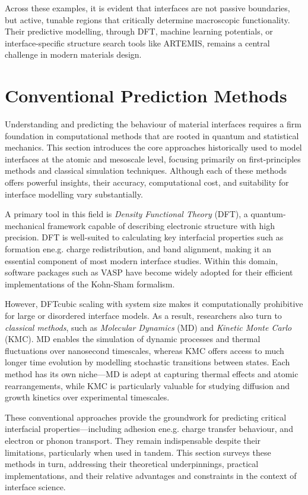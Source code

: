 Across these examples, it is evident that interfaces are not passive boundaries, but active, tunable regions that critically determine macroscopic functionality. Their predictive modelling, through DFT, machine learning potentials, or interface-specific structure search tools like ARTEMIS, remains a central challenge in modern materials design. 
 
\section{Conventional Prediction Methods} \label{section:conventional_methods} 
 
Understanding and predicting the behaviour of material interfaces requires a firm foundation in computational methods that are rooted in quantum and statistical mechanics. This section introduces the core approaches historically used to model interfaces at the atomic and mesoscale level, focusing primarily on first-principles methods and classical simulation techniques. Although each of these methods offers powerful insights, their accuracy, computational cost, and suitability for interface modelling vary substantially. 
 
A primary tool in this field is \textit{Density Functional Theory} (DFT), a quantum-mechanical framework capable of describing electronic structure with high precision. DFT is well-suited to calculating key interfacial properties such as formation ene.g. charge redistribution, and band alignment, making it an essential component of most modern interface studies. Within this domain, software packages such as \textsc{VASP} have become widely adopted for their efficient implementations of the Kohn-Sham formalism. 
 
However, DFT\rqss cubic scaling with system size makes it computationally prohibitive for large or disordered interface models. As a result, researchers also turn to \textit{classical methods}, such as \textit{Molecular Dynamics} (MD) and \textit{Kinetic Monte Carlo} (KMC). MD enables the simulation of dynamic processes and thermal fluctuations over nanosecond timescales, whereas KMC offers access to much longer time evolution by modelling stochastic transitions between states. Each method has its own niche---MD is adept at capturing thermal effects and atomic rearrangements, while KMC is particularly valuable for studying diffusion and growth kinetics over experimental timescales. 
 
These conventional approaches provide the groundwork for predicting critical interfacial properties---including adhesion ene.g. charge transfer behaviour, and electron or phonon transport. They remain indispensable despite their limitations, particularly when used in tandem. This section surveys these methods in turn, addressing their theoretical underpinnings, practical implementations, and their relative advantages and constraints in the context of interface science. 
 
